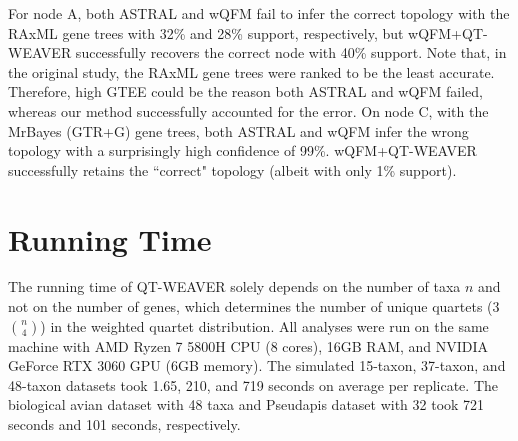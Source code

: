 \documentclass[10pt,a4paper]{article}
\begin{document}
For node A, both ASTRAL and wQFM fail to infer the correct topology with the RAxML gene trees with 32\% and 28\% support, respectively, but wQFM+QT-WEAVER successfully recovers the correct node with 40\% support. Note that, in the original study, the RAxML gene trees were ranked to be the least accurate. Therefore, high GTEE could be the reason both ASTRAL and wQFM failed, whereas our method successfully accounted for the error.  On node C, with the MrBayes (GTR+G) gene trees, both ASTRAL and wQFM infer the wrong topology with a surprisingly high confidence of 99\%. wQFM+QT-WEAVER successfully retains the ``correct" topology (albeit with only 1\% support).



\vspace{-10pt}
\section{Running Time}
The running time of QT-WEAVER solely depends on the number of taxa $n$ and not on the number of genes, which determines the number of unique quartets ($3$$n \choose 4$) in the weighted quartet distribution.
All analyses were run on the same machine with AMD Ryzen 7 5800H CPU (8 cores), 16GB RAM, and NVIDIA GeForce RTX 3060 GPU (6GB memory). The simulated 15-taxon, 37-taxon, and 48-taxon datasets took 1.65, 210, and 719 seconds on average per replicate. The biological avian dataset with 48 taxa and Pseudapis dataset with 32 took 721 seconds and 101 seconds, respectively.


        
\end{document}
